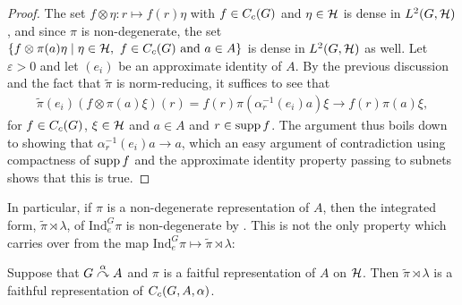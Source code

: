 \begin{proof}
	The set $ f \otimes \eta \colon r \mapsto f(r) \eta$ with $f \in C_c(G)$ and $\eta \in \mathcal{H}$ is dense in $L^2(G,\mathcal{H})$, and since $\pi$ is non-degenerate, the set $\{ f \otimes \pi(a) \eta \mid \eta \in \mathcal{H}, \ f \in C_c(G) \text{ and } a \in A \}$ is dense in $L^2(G, \mathcal{H})$ as well. Let $\varepsilon > 0$ and let $(e_i)$ be an approximate identity of $A$. By the previous discussion and the fact that $\tilde{\pi}$ is norm-reducing, it suffices to see that 
	\begin{align*}
		\tilde{\pi}(e_i) (f \otimes \pi(a) \xi)(r)=f(r) \pi(\alpha_{r}^{-1}(e_i)a) \xi  \to f(r) \pi(a) \xi,
	\end{align*}
	for $f \in C_c(G)$, $\xi \in \mathcal{H}$ and $a \in A$ and $r \in \operatorname{supp} f$. The argument thus boils down to showing that $\alpha_r^{-1}(e_i) a \to a$, which an easy argument of contradiction using compactness of $\operatorname{supp} f$ and the approximate identity property passing to subnets shows that this is true.
\end{proof}
\begin{remark}
	In particular, if $\pi$ is a non-degenerate representation of $A$, then the integrated form, $\tilde{\pi} \rtimes \lambda$, of $\mathrm{Ind}_e^G \pi$ is non-degenerate by . This is not the only property which carries over from the map $\mathrm{Ind}_e^G \pi \mapsto \tilde{\pi} \rtimes \lambda$:
\end{remark}
\begin{lemma}
	Suppose that $G \stackrel{\alpha}{\curvearrowright} A$ and $\pi$ is a faitful representation of $A$ on $\mathcal{H}$. Then $\tilde{\pi} \rtimes \lambda$ is a faithful representation of $C_c(G,A,\alpha)$.
	\label{}
\end{lemma}





